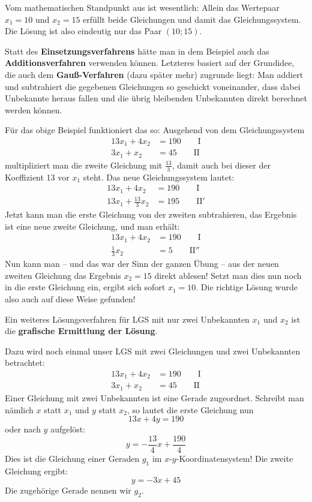 Vom mathematischen Standpunkt aus ist wesentlich: Allein das Wertepaar $x_1 = 10$ und $x_2 = 15$ erfüllt beide Gleichungen und damit das Gleichungssystem. Die Lösung ist also eindeutig nur das Paar $(10;15)$.\beispielende

Statt des \textbf{Einsetzungsverfahrens} hätte man in dem Beispiel auch das \textbf{Additionsverfahren} verwenden können. Letzteres basiert auf der Grundidee, die auch dem \textbf{Gauß-Verfahren} (dazu später mehr) zugrunde liegt: Man addiert und subtrahiert die gegebenen Gleichungen so geschickt voneinander, dass dabei Unbekannte heraus fallen und die übrig bleibenden Unbekannten direkt berechnet werden können.

Für das obige Beispiel funktioniert das so: Ausgehend von dem Gleichungssystem
\begin{align*}
  13x_1 + 4x_2 &= 190 \qquad \text{I}\\
  3x_1 + x_2 &= 45 \qquad \text{II}
\end{align*}
multipliziert man die zweite Gleichung mit $\tfrac{13}{3}$, damit auch bei dieser der Koeffizient 13 vor $x_1$ steht. Das neue Gleichungssystem lautet:
\begin{align*}
  13x_1 + 4x_2 &= 190 \qquad \text{I}\\
  13x_1 + \tfrac{13}{3}x_2 &= 195 \qquad \text{II}'
\end{align*}
Jetzt kann man die erste Gleichung von der zweiten subtrahieren, das Ergebnis ist eine neue zweite Gleichung, und man erhält:
\begin{align*}
  13x_1 + 4x_2 &= 190 \qquad \text{I}\\
  \tfrac{1}{3}x_2 &= 5 \qquad \text{II}''
\end{align*}
Nun kann man -- und das war der Sinn der ganzen Übung -- aus der neuen zweiten Gleichung das Ergebnis $x_2 = 15$ direkt ablesen! Setzt man dies nun noch in die erste Gleichung ein, ergibt sich sofort $x_1 = 10$. Die richtige Lösung wurde also auch auf diese Weise gefunden!

Ein weiteres Lösungsverfahren für LGS mit nur zwei Unbekannten $x_1$ und $x_2$ ist die \textbf{grafische Ermittlung der Lösung}.

Dazu wird noch einmal unser LGS mit zwei Gleichungen und zwei Unbekannten betrachtet:
\begin{align*}
  13x_1 + 4x_2 &= 190 \qquad \text{I}\\
  3x_1 + x_2 &= 45 \qquad \text{II}
\end{align*}
Einer Gleichung mit zwei Unbekannten ist eine Gerade zugeordnet. Schreibt man nämlich $x$ statt $x_1$ und $y$ statt $x_2$, so lautet die erste Gleichung nun
\[ 13x + 4y = 190 \]
oder nach $y$ aufgelöst:
\[ y = -\frac{13}{4}x + \frac{190}{4} \]
Dies ist die Gleichung einer Geraden $g_1$ im $x$-$y$-Koordinatensystem! Die zweite Gleichung ergibt:
\[ y = -3x + 45 \]
Die zugehörige Gerade nennen wir $g_2$.

